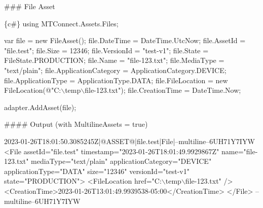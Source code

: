 \#\#\# File Asset 
\begin{DoxyCode}
\{c#\}
using MTConnect.Assets.Files;

var file = new FileAsset();
file.DateTime = DateTime.UtcNow;
file.AssetId = "file.test";
file.Size = 12346;
file.VersionId = "test-v1";
file.State = FileState.PRODUCTION;
file.Name = "file-123.txt";
file.MediaType = "text/plain";
file.ApplicationCategory = ApplicationCategory.DEVICE;
file.ApplicationType = ApplicationType.DATA;
file.FileLocation = new FileLocation(@"C:\(\backslash\)temp\(\backslash\)file-123.txt");
file.CreationTime = DateTime.Now;

adapter.AddAsset(file);
\end{DoxyCode}
 \#\#\#\# Output (with Multiline\+Assets = true) 
\begin{DoxyCode}
2023-01-26T18:01:50.3085245Z|@ASSET@|file.test|File|--multiline--6UH71Y7IYW
<File assetId="file.test" timestamp="2023-01-26T18:01:49.9929867Z" name="file-123.txt"
       mediaType="text/plain" applicationCategory="DEVICE" applicationType="DATA" size="12346" versionId="test-v1" state="PRODUCTION">
  <FileLocation href="C:\(\backslash\)temp\(\backslash\)file-123.txt" />
  <CreationTime>2023-01-26T13:01:49.9939538-05:00</CreationTime>
</File>
--multiline--6UH71Y7IYW
\end{DoxyCode}


